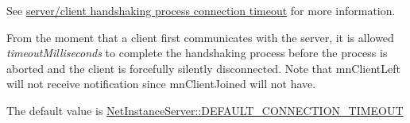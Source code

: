 \label{group__proc_commands_ga91b33a4ec5298a27187a018a464722f1}
See \hyperlink{handshake_page_handshakeSecurityConnectionTimeout}{server/client handshaking process connection timeout} for more information. \par
\par


From the moment that a client first communicates with the server, it is allowed {\itshape timeoutMilliseconds\/} to complete the handshaking process before the process is aborted and the client is forcefully silently disconnected. Note that mnClientLeft will not receive notification since mnClientJoined will not have. \par
\par


The default value is \hyperlink{class_net_instance_server_ace7e83c6a82f0810cee2c7c638bb9397}{NetInstanceServer::DEFAULT\_\-CONNECTION\_\-TIMEOUT}\par
\par



